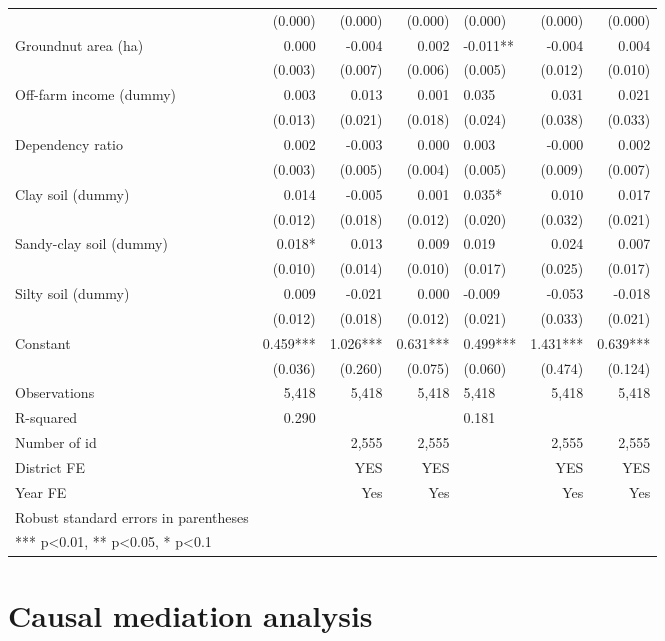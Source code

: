 \documentclass[
]{article}
\begin{document}
\begin{landscape}
\begin{longtable}[t]{lrrrlrr}
 & (0.000) & (0.000) & (0.000) & (0.000) & (0.000) & (0.000)\\
Groundnut area (ha) & 0.000 & -0.004 & 0.002 & -0.011** & -0.004 & 0.004\\
\addlinespace
 & (0.003) & (0.007) & (0.006) & (0.005) & (0.012) & (0.010)\\
Off-farm income (dummy) & 0.003 & 0.013 & 0.001 & 0.035 & 0.031 & 0.021\\
 & (0.013) & (0.021) & (0.018) & (0.024) & (0.038) & (0.033)\\
Dependency ratio & 0.002 & -0.003 & 0.000 & 0.003 & -0.000 & 0.002\\
 & (0.003) & (0.005) & (0.004) & (0.005) & (0.009) & (0.007)\\
\addlinespace
Clay soil (dummy) & 0.014 & -0.005 & 0.001 & 0.035* & 0.010 & 0.017\\
 & (0.012) & (0.018) & (0.012) & (0.020) & (0.032) & (0.021)\\
Sandy-clay soil (dummy) & 0.018* & 0.013 & 0.009 & 0.019 & 0.024 & 0.007\\
 & (0.010) & (0.014) & (0.010) & (0.017) & (0.025) & (0.017)\\
Silty soil (dummy) & 0.009 & -0.021 & 0.000 & -0.009 & -0.053 & -0.018\\
\addlinespace
 & (0.012) & (0.018) & (0.012) & (0.021) & (0.033) & (0.021)\\
Constant & 0.459*** & 1.026*** & 0.631*** & 0.499*** & 1.431*** & 0.639***\\
 & (0.036) & (0.260) & (0.075) & (0.060) & (0.474) & (0.124)\\
Observations & 5,418 & 5,418 & 5,418 & 5,418 & 5,418 & 5,418\\
R-squared & 0.290 &  &  & 0.181 &  & \\
\addlinespace
Number of id &  & 2,555 & 2,555 &  & 2,555 & 2,555\\
District FE &  & YES & YES &  & YES & YES\\
Year FE &  & Yes & Yes &  & Yes & Yes\\
Robust standard errors in parentheses &  &  &  &  &  & \\
*** p<0.01, ** p<0.05, * p<0.1 &  &  &  &  &  & \\*
\end{longtable}
\endgroup{}
\end{landscape}
\newpage

\hypertarget{causal-mediation-analysis}{%
\section{Causal mediation analysis}\label{causal-mediation-analysis}}
\end{document}

